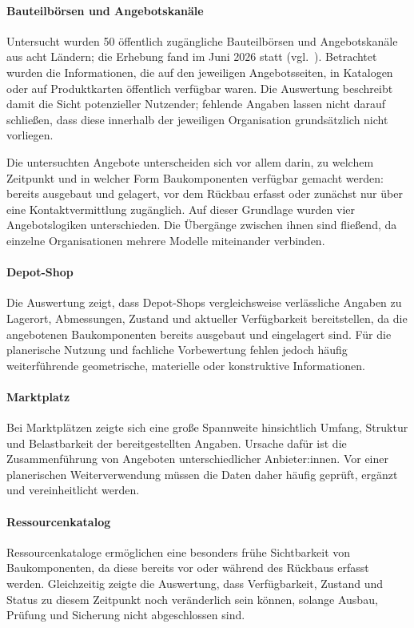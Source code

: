 \documentclass[type=zwischenbericht,theme=dark]{zukunftbau}
\begin{document}
\begin{SemioNest}
\paragraph{Bauteilbörsen und Angebotskanäle}
Untersucht wurden 50 öffentlich zugängliche Bauteilbörsen und Angebotskanäle aus acht Ländern; die Erhebung fand im Juni 2026 statt (vgl.\ ). Betrachtet wurden die Informationen, die auf den jeweiligen Angebotsseiten, in Katalogen oder auf Produktkarten öffentlich verfügbar waren. Die Auswertung beschreibt damit die Sicht potenzieller Nutzender; fehlende Angaben lassen nicht darauf schließen, dass diese innerhalb der jeweiligen Organisation grundsätzlich nicht vorliegen.

Die untersuchten Angebote unterscheiden sich vor allem darin, zu welchem Zeitpunkt und in welcher Form Baukomponenten verfügbar gemacht werden: bereits ausgebaut und gelagert, vor dem Rückbau erfasst oder zunächst nur über eine Kontaktvermittlung zugänglich. Auf dieser Grundlage wurden vier Angebotslogiken unterschieden. Die Übergänge zwischen ihnen sind fließend, da einzelne Organisationen mehrere Modelle miteinander verbinden.

\begin{SemioNest}
\paragraph{Depot-Shop}
Die Auswertung zeigt, dass Depot-Shops vergleichsweise verlässliche Angaben zu Lagerort, Abmessungen, Zustand und aktueller Verfügbarkeit bereitstellen, da die angebotenen Baukomponenten bereits ausgebaut und eingelagert sind. Für die planerische Nutzung und fachliche Vorbewertung fehlen jedoch häufig weiterführende geometrische, materielle oder konstruktive Informationen.

\paragraph{Marktplatz}
Bei Marktplätzen zeigte sich eine große Spannweite hinsichtlich Umfang, Struktur und Belastbarkeit der bereitgestellten Angaben. Ursache dafür ist die Zusammenführung von Angeboten unterschiedlicher Anbieter:innen. Vor einer planerischen Weiterverwendung müssen die Daten daher häufig geprüft, ergänzt und vereinheitlicht werden.

\paragraph{Ressourcenkatalog}
Ressourcenkataloge ermöglichen eine besonders frühe Sichtbarkeit von Baukomponenten, da diese bereits vor oder während des Rückbaus erfasst werden. Gleichzeitig zeigte die Auswertung, dass Verfügbarkeit, Zustand und Status zu diesem Zeitpunkt noch veränderlich sein können, solange Ausbau, Prüfung und Sicherung nicht abgeschlossen sind.


\end{SemioNest}
\end{SemioNest}
\end{document}
